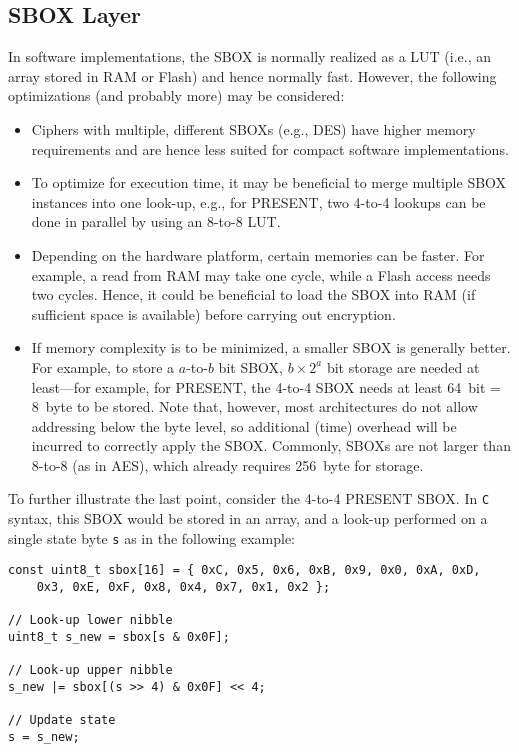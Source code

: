\subsection{\acs{SBOX} Layer}
\label{chap:symmetric_crypto:sbox}
In software implementations, the \ac{SBOX} is normally realized as a \ac{LUT} (i.e., an array stored in \ac{RAM} or Flash) and hence normally fast. However, the following optimizations (and probably more) may be considered:

\begin{itemize}
	\item Ciphers with multiple, different \acp{SBOX} (e.g., \ac{DES}) have higher memory requirements and are hence less suited for compact software implementations.
	
	\item To optimize for execution time, it may be beneficial to merge multiple \ac{SBOX} instances into one look-up, e.g., for PRESENT, two 4-to-4 lookups can be done in parallel by using an 8-to-8 \ac{LUT}.
	
	\item Depending on the hardware platform, certain memories can be faster. For example, a read from \ac{RAM} may take one cycle, while a Flash access needs two cycles. Hence, it could be beneficial to load the \ac{SBOX} into \ac{RAM} (if sufficient space is available) before carrying out encryption.	
	
	\item If memory complexity is to be minimized, a smaller \ac{SBOX} is generally better. For example, to store a $a$-to-$b$ bit \ac{SBOX}, $b \times 2^a$ bit storage are needed at least---for example, for PRESENT, the 4-to-4 \ac{SBOX} needs at least 64~bit = 8~byte to be stored. Note that, however, most architectures do not allow addressing below the byte level, so additional (time) overhead will be incurred to correctly apply the \ac{SBOX}. Commonly, \acp{SBOX} are not larger than 8-to-8 (as in \ac{AES}), which already requires 256~byte for storage.
\end{itemize}

To further illustrate the last point, consider the 4-to-4 PRESENT \ac{SBOX}. In \verb+C+ syntax, this \ac{SBOX} would be stored in an array, and a look-up performed on a single state byte \verb+s+ as in the following example:

\lstset{language=C}
\begin{lstlisting}
const uint8_t sbox[16] = { 0xC, 0x5, 0x6, 0xB, 0x9, 0x0, 0xA, 0xD, 
    0x3, 0xE, 0xF, 0x8, 0x4, 0x7, 0x1, 0x2 };

// Look-up lower nibble
uint8_t s_new = sbox[s & 0x0F];

// Look-up upper nibble
s_new |= sbox[(s >> 4) & 0x0F] << 4;

// Update state
s = s_new;
\end{lstlisting}

